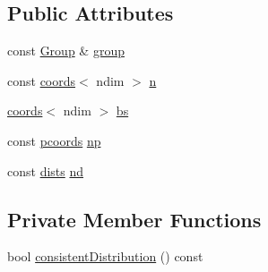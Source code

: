 \subsection*{Public Attributes}
\begin{DoxyCompactItemize}
\item 
const \hyperlink{classshark_1_1_group}{Group} \& \hyperlink{classshark_1_1ndim_1_1_domain_a2bbf100371762ce405efd218bc1e3d0f}{group}
\item 
const \hyperlink{structshark_1_1ndim_1_1coords}{coords}$<$ ndim $>$ \hyperlink{classshark_1_1ndim_1_1_domain_ab942ffcf99c5ee0f2589c8b9104abcfd}{n}
\item 
\hyperlink{structshark_1_1ndim_1_1coords}{coords}$<$ ndim $>$ \hyperlink{classshark_1_1ndim_1_1_domain_a2be17b3d153f7fbbede6eec0afd17ebe}{bs}
\item 
const \hyperlink{classshark_1_1ndim_1_1_domain_a9684ccd8af33cff7639c782290ac37ee}{pcoords} \hyperlink{classshark_1_1ndim_1_1_domain_a1d15ab99cb54dcc456c5bba8699bcddf}{np}
\item 
const \hyperlink{classshark_1_1ndim_1_1_domain_a8d425ae958ccde33494fe1346307e991}{dists} \hyperlink{classshark_1_1ndim_1_1_domain_a4964336cc4ccdb2bfcc616fdcbb9a570}{nd}
\end{DoxyCompactItemize}
\subsection*{Private Member Functions}
\begin{DoxyCompactItemize}
\item 
bool \hyperlink{classshark_1_1ndim_1_1_domain_af10c994124cd93210194db65d5bb3c5b}{consistent\+Distribution} () const
\end{DoxyCompactItemize}

